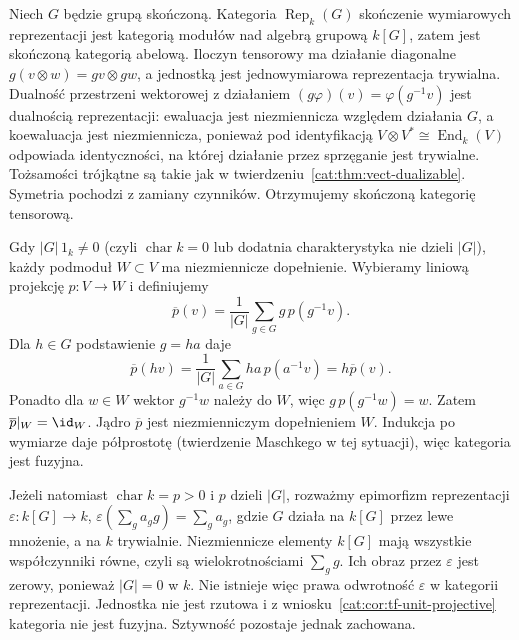 \begin{przyklad}\label{cat:ex:tf-finite-group-representations}
Niech $G$ będzie grupą skończoną. Kategoria $\operatorname{Rep}_k(G)$ skończenie wymiarowych reprezentacji jest kategorią modułów nad algebrą grupową $k[G]$, zatem jest skończoną kategorią abelową. Iloczyn tensorowy ma działanie diagonalne $g(v\otimes w)=gv\otimes gw$, a jednostką jest jednowymiarowa reprezentacja trywialna. Dualność przestrzeni wektorowej z działaniem $(g\varphi)(v)=\varphi(g^{-1}v)$ jest dualnością reprezentacji: ewaluacja jest niezmiennicza względem działania $G$, a koewaluacja jest niezmiennicza, ponieważ pod identyfikacją $V\otimes V^*\cong\operatorname{End}_k(V)$ odpowiada identyczności, na której działanie przez sprzęganie jest trywialne. Tożsamości trójkątne są takie jak w twierdzeniu~\ref{cat:thm:vect-dualizable}. Symetria pochodzi z zamiany czynników. Otrzymujemy skończoną kategorię tensorową.

Gdy $|G|\,1_k\neq0$ (czyli $\operatorname{char}k=0$ lub dodatnia charakterystyka nie dzieli $|G|$), każdy podmoduł $W\subset V$ ma niezmiennicze dopełnienie. Wybieramy liniową projekcję $p:V\to W$ i definiujemy
\[
 \overline p(v)=\frac{1}{|G|}\sum_{g\in G}g\,p(g^{-1}v).
\]
Dla $h\in G$ podstawienie $g=ha$ daje
\[
 \overline p(hv)=\frac{1}{|G|}\sum_{a\in G}ha\,p(a^{-1}v)
 =h\overline p(v).
\]
Ponadto dla $w\in W$ wektor $g^{-1}w$ należy do $W$, więc $g\,p(g^{-1}w)=w$. Zatem $\overline p|_W=\id_W$. Jądro $\overline p$ jest niezmienniczym dopełnieniem $W$. Indukcja po wymiarze daje półprostotę (twierdzenie Maschkego w tej sytuacji), więc kategoria jest fuzyjna.

Jeżeli natomiast $\operatorname{char}k=p>0$ i $p$ dzieli $|G|$, rozważmy epimorfizm reprezentacji $\varepsilon:k[G]\to k$, $\varepsilon(\sum_g a_g g)=\sum_g a_g$, gdzie $G$ działa na $k[G]$ przez lewe mnożenie, a na $k$ trywialnie. Niezmiennicze elementy $k[G]$ mają wszystkie współczynniki równe, czyli są wielokrotnościami $\sum_g g$. Ich obraz przez $\varepsilon$ jest zerowy, ponieważ $|G|=0$ w $k$. Nie istnieje więc prawa odwrotność $\varepsilon$ w kategorii reprezentacji. Jednostka nie jest rzutowa i z wniosku~\ref{cat:cor:tf-unit-projective} kategoria nie jest fuzyjna. Sztywność pozostaje jednak zachowana.
\end{przyklad}

